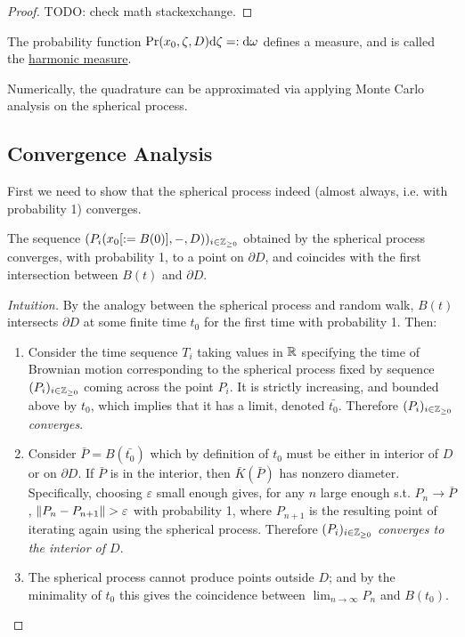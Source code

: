 \documentclass[10pt]{article}
\begin{document}
\begin{proof}
    {\color{red} TODO: check math stackexchange.}
\end{proof}

\begin{remark}
    The probability function $\mathrm{Pr}(x_0, \zeta, D) \mathrm{d} \zeta =: \mathrm{d} \omega$ defines a measure, and is called the \underline{harmonic measure}.
\end{remark}

\textstart
Numerically, the quadrature can be approximated via applying Monte Carlo analysis on the spherical process.

\subsection{Convergence Analysis}

\textstart
First we need to show that the spherical process indeed (almost always, i.e. with probability 1) converges.

\begin{proposition}
    The sequence $(P_i(x_0 [:= B(0)], -, D))_{i \in \mathbb{Z}_{\geq 0}}$ obtained by the spherical process converges, with probability 1, to a point on $\partial D$, and coincides with the first intersection between $B(t)$ and $\partial D$.
\end{proposition}

\begin{proof}[Intuition]
    By the analogy between the spherical process and random walk, $B(t)$ intersects $\partial D$ at some finite time $t_0$ for the first time with probability 1. Then:
    \begin{enumerate}
        \item Consider the time sequence $T_i$ taking values in $\mathbb{R}$ specifying the time of Brownian motion corresponding to the spherical process fixed by sequence $(P_i)_{i \in \mathbb{Z}_{\geq 0}}$ coming across the point $P_i$. It is strictly increasing, and bounded above by $t_0$, which implies that it has a limit, denoted $\bar{t_0}$. Therefore \emph{$(P_i)_{i \in \mathbb{Z}_{\geq 0}}$ converges}.
        \item Consider $\bar{P} = B(\bar{t_0})$ which by definition of $t_0$ must be either in interior of $D$ or on $\partial D$. If $\bar{P}$ is in the interior, then $\bar{K}(\bar{P})$ has nonzero diameter. Specifically, choosing $\varepsilon$ small enough gives, for any $n$ large enough s.t. $P_n \to \bar{P}$, $\left\|P_n - P_{n+1}\right\| > \varepsilon$ with probability 1, where $P_{n+1}$ is the resulting point of iterating again using the spherical process. Therefore \emph{$(P_i)_{i \in \mathbb{Z}_{\geq 0}}$ converges to the interior of $D$}.
        \item The spherical process cannot produce points outside $D$; and by the minimality of $t_0$ this gives the coincidence between $\lim_{n \to \infty} P_n$ and $B(t_0)$. 
    \end{enumerate}
\end{proof}
\end{document}
